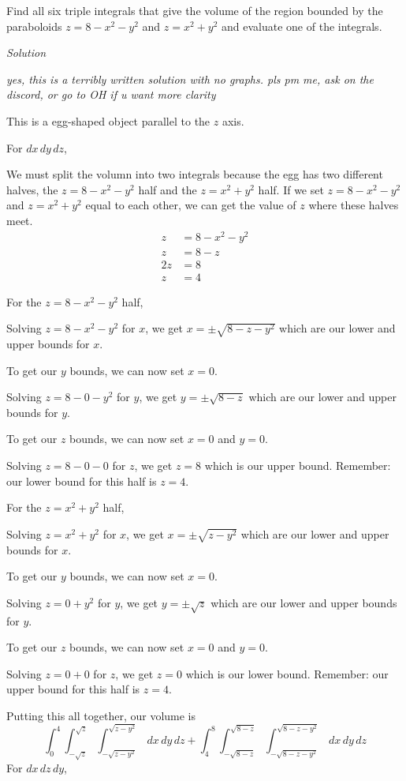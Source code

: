 \documentclass{article}
\newcommand{\Solution}{\textit{Solution}}
\begin{document}
Find all six triple integrals that give the volume of the region bounded by the paraboloids $z=8-x^2-y^2$ and $z=x^2+y^2$ and evaluate one of the integrals.

\Solution

\textit{yes, this is a terribly written solution with no graphs. pls pm me, ask on the discord, or go to OH if u want more clarity}

This is a egg-shaped object parallel to the $z$ axis.

For $dx\,dy\,dz$,

We must split the volumn into two integrals because the egg has two different halves, the $z=8-x^2-y^2$ half and the $z=x^2+y^2$ half. If we set $z=8-x^2-y^2$ and $z=x^2+y^2$ equal to each other, we can get the value of $z$ where these halves meet.
\begin{align*}
    z&=8-x^2-y^2\\
    z&=8-z\tag{we know $z=x^2+y^2$}\\
    2z&=8\\
    z&=4
\end{align*}

For the $z=8-x^2-y^2$ half, 

Solving $z=8-x^2-y^2$ for $x$, we get $x=\pm \sqrt{8-z-y^2}$ which are our lower and upper bounds for $x$.

To get our $y$ bounds, we can now set $x=0$.

Solving $z=8-0-y^2$ for $y$, we get $y=\pm\sqrt{8-z}$ which are our lower and upper bounds for $y$.

To get our $z$ bounds, we can now set $x=0$ and $y=0$.

Solving $z=8-0-0$ for $z$, we get $z=8$ which is our upper bound. Remember: our lower bound for this half is $z=4$.

For the $z=x^2+y^2$ half,

Solving $z=x^2+y^2$ for $x$, we get $x=\pm\sqrt{z-y^2}$ which are our lower and upper bounds for $x$.

To get our $y$ bounds, we can now set $x=0$.

Solving $z=0+y^2$ for $y$, we get $y=\pm \sqrt{z}$ which are our lower and upper bounds for $y$.

To get our $z$ bounds, we can now set $x=0$ and $y=0$.

Solving $z=0+0$ for $z$, we get $z=0$ which is our lower bound. Remember: our upper bound for this half is $z=4$.

Putting this all together, our volume is
\begin{equation*}
   \int_0^4\int_{-\sqrt{z}}^{\sqrt{z}}\int_{-\sqrt{z-y^2}}^{\sqrt{z-y^2}}\,dx\,dy\,dz+ \int_4^8\int_{-\sqrt{8-z}}^{\sqrt{8-z}}\int_{-\sqrt{8-z-y^2}}^{\sqrt{8-z-y^2}}\,dx\,dy\,dz
\end{equation*}
For $dx\,dz\,dy$,
\end{document}
